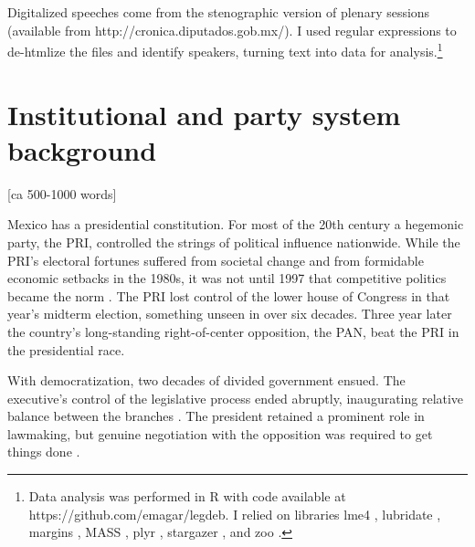 \documentclass[letter,12pt]{article}
\begin{document}
Digitalized speeches come from the stenographic version of plenary sessions (available from http://cronica.diputados.gob.mx/). I used regular expressions to de-htmlize the files and identify speakers, turning text into data for analysis.\footnote{Data analysis was performed in R \citep{r.cite} with code available at https://github.com/emagar/legdeb. I relied on libraries lme4 \citep{r.lme4}, lubridate \citep{r.lubridate}, margins \citep{r.margins}, MASS \citep{r.mass}, plyr \citep{r.plyr}, stargazer \citep{r.stargazer}, and zoo \citep{r.zoo}.}

\section{Institutional and party system background} [ca 500-1000 words]

Mexico has a presidential constitution. For most of the 20th century a hegemonic party, the PRI, controlled the strings of political influence nationwide. While the PRI's electoral fortunes suffered from societal change and from formidable economic setbacks in the 1980s, it was not until 1997 that competitive politics became the norm \citep{cosio.villegas.1981,molinar.1991a,cornelius.1996}. The PRI lost control of the lower house of Congress in that year's midterm election, something unseen in over six decades. Three year later the country's long-standing right-of-center opposition, the PAN, beat the PRI in the presidential race. 


With democratization, two decades of divided government ensued. The executive's control of the legislative process ended abruptly, inaugurating relative balance between the branches \citep{weldon.1997,lujambio.segl.2000}. The president retained a prominent role in lawmaking, but genuine negotiation with the opposition was required to get things done \citep{casarSinMay2013,bejarQuienLegisla2012}. 

\end{document}
